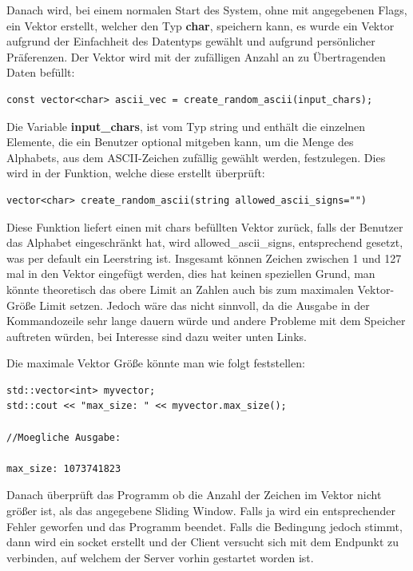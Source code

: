 \documentclass{article}
\begin{document}
Danach wird, bei einem normalen Start des System, ohne mit angegebenen Flags, ein Vektor erstellt, welcher den Typ \textbf{char}, speichern kann, es wurde ein Vektor aufgrund der Einfachheit des Datentyps gewählt und aufgrund persönlicher Präferenzen. Der Vektor wird mit der zufälligen Anzahl an zu Übertragenden Daten befüllt:

\begin{lstlisting}
const vector<char> ascii_vec = create_random_ascii(input_chars);
\end{lstlisting}

Die Variable \textbf{input\_chars}, ist vom Typ string und enthält die einzelnen Elemente, die ein Benutzer optional mitgeben kann, um die Menge des Alphabets, aus dem ASCII-Zeichen zufällig gewählt werden, festzulegen. Dies wird in der Funktion, welche diese erstellt überprüft:

\begin{lstlisting}
vector<char> create_random_ascii(string allowed_ascii_signs="")
\end{lstlisting}

Diese Funktion liefert einen mit chars befüllten Vektor zurück, falls der Benutzer das Alphabet eingeschränkt hat, wird allowed\_ascii\_signs, entsprechend gesetzt, was per default ein Leerstring ist. Insgesamt können Zeichen zwischen 1 und 127 mal in den Vektor eingefügt werden, dies hat keinen speziellen Grund, man könnte theoretisch das obere Limit an Zahlen auch bis zum maximalen Vektor-Größe Limit setzen. Jedoch wäre das nicht sinnvoll, da die Ausgabe in der Kommandozeile sehr lange dauern würde und andere Probleme mit dem Speicher auftreten würden, bei Interesse sind dazu weiter unten Links.
 
Die maximale Vektor Größe könnte man
wie folgt feststellen:
\begin{lstlisting}
std::vector<int> myvector;
std::cout << "max_size: " << myvector.max_size();

//Moegliche Ausgabe:

max_size: 1073741823
\end{lstlisting}

Danach überprüft das Programm ob die Anzahl der Zeichen im Vektor nicht größer ist, als das angegebene Sliding Window. Falls ja wird ein entsprechender Fehler geworfen und das Programm beendet. Falls die Bedingung jedoch stimmt, dann wird ein socket erstellt
und der Client versucht sich mit dem Endpunkt zu verbinden, auf welchem der Server vorhin gestartet worden ist.
\end{document}
